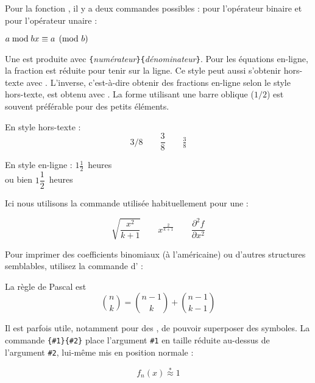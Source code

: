 Pour la fonction , il y a deux commandes possibles : 
 pour l'opérateur binaire et 
 pour l'opérateur unaire :
\begin{example}
$a\bmod b \\
 x\equiv a \pmod{b}$
\end{example}

Une \textbf{} est produite avec
\verb|{|\emph{numérateur}\verb|}{|\emph{dénominateur}\verb|}|. Pour
les équations en-ligne, la fraction est réduite pour tenir sur la
ligne. Ce style peut aussi s'obtenir hors-texte avec
. L'inverse, c'est-à-dire obtenir des fractions en-ligne
selon le style hors-texte, est obtenu avec .  La forme
utilisant une barre oblique ($1/2$) est souvent préférable pour des
petits éléments.
\begin{example}
En style hors-texte :
\begin{equation*}
  3/8 \qquad \frac{3}{8}
  \qquad \tfrac{3}{8}
\end{equation*}
\end{example}

\begin{example}
En style en-ligne :
$1\frac{1}{2}$~heures \\
ou bien $1\dfrac{1}{2}$~heures
\end{example}

Ici nous utilisons la commande  utilisée habituellement
pour une  :
\begin{example}
\begin{equation*}
  \sqrt{\frac{x^2}{k+1}}\qquad
  x^\frac{2}{k+1}\qquad
  \frac{\partial^2f}
  {\partial x^2}
\end{equation*}
\end{example}

Pour imprimer des coefficients binomiaux (à l'américaine) ou d'autres
structures semblables, utilisez la commande  d' :
\begin{example}
La règle de Pascal est
\begin{equation*}
 \binom{n}{k} =\binom{n-1}{k}
 + \binom{n-1}{k-1}
\end{equation*}
\end{example}
 
Il est parfois utile, notamment pour des , de
pouvoir superposer des symboles.  La commande
\verb|{#1}{#2}| place l'argument \verb|#1| en taille
réduite au-dessus de l'argument \verb|#2|, lui-même mis en position
normale :
\begin{example}
\begin{equation*}
 f_n(x) \stackrel{*}{\approx} 1
\end{equation*}
\end{example}

